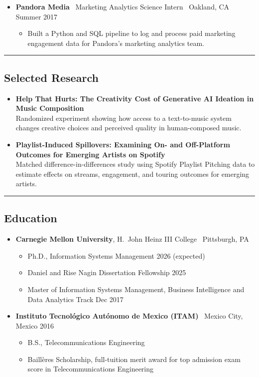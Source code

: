 \documentclass[10pt,letterpaper]{article}
\newcommand{\sep}{{\color{gray}\,\textbullet\,\,}}
\newcommand{\hsep}{\noindent\textcolor{gray}{\rule{\textwidth}{0.5pt}}}
\newcommand{\block}[1]{\begin{samepage}\hsep\subsection*{#1}\end{samepage}}
\begin{document}
\begin{itemize}[leftmargin=0pt, label={}]
\begin{itemize}
  \item Maintained KPI tracking, dashboards, and MAU reporting and forecasting workflows; used Hive and Airflow to support recurring targeting datasets and Tableau to monitor campaign performance.
  \end{itemize}
\item \textbf{Pandora Media} \sep Marketing Analytics Science Intern \sep Oakland, CA \hfill Summer 2017
  \begin{itemize}
  \item Built a Python and SQL pipeline to log and process paid marketing engagement data for Pandora's marketing analytics team.
  \end{itemize}
\end{itemize}

\block{Selected Research}

\begin{itemize}[leftmargin=0pt, label={}]
\item \textbf{Help That Hurts: The Creativity Cost of Generative AI Ideation in Music Composition} \\
Randomized experiment showing how access to a text-to-music system changes creative choices and perceived quality in human-composed music.
\item \textbf{Playlist-Induced Spillovers: Examining On- and Off-Platform Outcomes for Emerging Artists on Spotify} \\
Matched difference-in-differences study using Spotify Playlist Pitching data to estimate effects on streams, engagement, and touring outcomes for emerging artists.
\end{itemize}

\block{Education}

\begin{itemize}[leftmargin=0pt, label={}]
\item \textbf{Carnegie Mellon University}, H.\ John Heinz III College \sep Pittsburgh, PA
  \begin{itemize}[label={}]
  \item Ph.D., Information Systems Management \hfill 2026 (expected)
  \item Daniel and Rise Nagin Dissertation Fellowship \hfill 2025
  \item Master of Information Systems Management, Business Intelligence and Data Analytics Track \hfill Dec 2017
  \end{itemize}
\item \textbf{Instituto Tecnol\'ogico Aut\'onomo de Mexico (ITAM)} \sep Mexico City, Mexico \hfill 2016
  \begin{itemize}[label={}]
  \item B.S., Telecommunications Engineering
  \item Baill\`eres Scholarship, full-tuition merit award for top admission exam score in Telecommunications Engineering
  \end{itemize}
\end{itemize}
\end{document}
